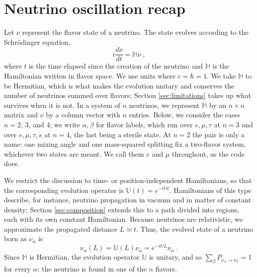 \documentclass[final,5p,times,twocolumn,sort,compress]{elsarticle}
\begin{document}

\section{Neutrino oscillation recap}
\label{sec:general_remarks}

Let $\nu$ represent the flavor state of a neutrino.  The state evolves according to the Schr\"odinger equation,
\begin{equation}
 i \frac{d\nu}{dt} = \mathbb{H} \nu \;,
\end{equation}
where $t$ is the time elapsed since the creation of the neutrino and $\mathbb{H}$ is the Hamiltonian written in flavor space.  We use units where $c = \hbar = 1$.  We take $\mathbb{H}$ to be Hermitian, which is what makes the evolution unitary and conserves the number of neutrinos summed over flavors; Section \ref{sec:limitations} takes up what survives when it is not.  In a system of $n$ neutrinos, we represent $\mathbb{H}$ by an $n \times n$ matrix and $\nu$ by a column vector with $n$ entries.  Below, we consider the cases $n = 2$, 3, and 4; we write $\alpha, \beta$ for flavor labels, which run over $e, \mu, \tau$ at $n = 3$ and over $e, \mu, \tau, s$ at $n = 4$, the last being a sterile state.  At $n = 2$ the pair is only a name: one mixing angle and one mass-squared splitting fix a two-flavor system, whichever two states are meant.  We call them $e$ and $\mu$ throughout, as the code does.

We restrict the discussion to time- or position-independent Hamiltonians, so that the corresponding evolution operator is $\mathbb{U}\left(t\right) = e^{-i \mathbb{H} t}$.  Hamiltonians of this type describe, for instance, neutrino propagation in vacuum and in matter of constant density; Section \ref{sec:composition} extends this to a path divided into regions, each with its own constant Hamiltonian.  Because neutrinos are relativistic, we approximate the propagated distance $L \simeq t$.  Thus, the evolved state of a neutrino born as $\nu_\alpha$ is
\begin{equation}
 \label{equ:evolved_state}
 \nu_\alpha\left(L\right) 
 = \mathbb{U}(L) \nu_\alpha
 = e^{-i \mathbb{H} L} \nu_\alpha \;.
\end{equation}
Since $\mathbb{H}$ is Hermitian, the evolution operator $\mathbb{U}$ is unitary, and so $\sum_\beta P_{\nu_\alpha \to \nu_\beta} = 1$ for every $\alpha$: the neutrino is found in one of the $n$ flavors.
\end{document}
